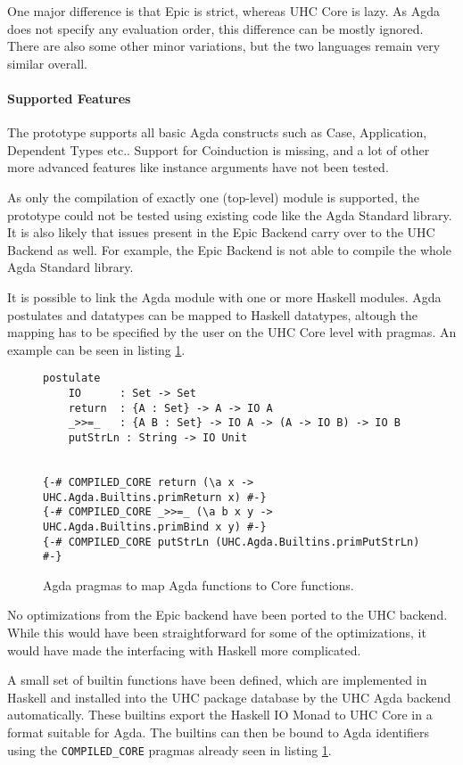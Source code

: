 \documentclass[12pt, a4paper, twoside]{report}
\begin{document}
One major difference is that Epic is strict, whereas UHC Core is lazy. As Agda does not specify
any evaluation order, this difference can be mostly ignored. There are also some other
minor variations, but the two languages remain very similar overall.

\paragraph{Supported Features}
The prototype supports all basic Agda constructs such as Case, Application, Dependent Types etc..
Support for Coinduction is missing, and a lot of other more advanced features like instance arguments
have not been tested.

As only the compilation of exactly one (top-level) module is supported, the prototype could not
be tested using existing code like the Agda Standard library. It is also likely that issues
present in the Epic Backend carry over to the UHC Backend as well. For example, the Epic
Backend is not able to compile the whole Agda Standard library.

It is possible to link the Agda module with one or more Haskell modules. Agda postulates
and datatypes can be mapped to Haskell datatypes, altough the mapping has to be specified
by the user on the UHC Core level with pragmas. An example can be seen in listing \ref{lst:agda-hs-pragmas}.


\begin{figure}
\begin{lstlisting}
postulate
    IO      : Set -> Set
    return  : {A : Set} -> A -> IO A
    _>>=_   : {A B : Set} -> IO A -> (A -> IO B) -> IO B
    putStrLn : String -> IO Unit


{-# COMPILED_CORE return (\a x -> UHC.Agda.Builtins.primReturn x) #-}
{-# COMPILED_CORE _>>=_ (\a b x y -> UHC.Agda.Builtins.primBind x y) #-}
{-# COMPILED_CORE putStrLn (UHC.Agda.Builtins.primPutStrLn) #-}
\end{lstlisting}
\caption{Agda pragmas to map Agda functions to Core functions.}
\label{lst:agda-hs-pragmas}
\end{figure}

No optimizations from the Epic backend have been ported to the UHC backend. While this
would have been straightforward for some of the optimizations, it would have made the
interfacing with Haskell more complicated.

A small set of builtin functions have been defined, which are implemented in Haskell
and installed into the UHC package database by the UHC Agda backend automatically. These
builtins export the Haskell IO Monad to UHC Core in a format suitable for Agda.
The builtins can then be bound to Agda identifiers using the \texttt{COMPILED_CORE} pragmas
already seen in listing \ref{lst:agda-hs-pragmas}.
\end{document}
